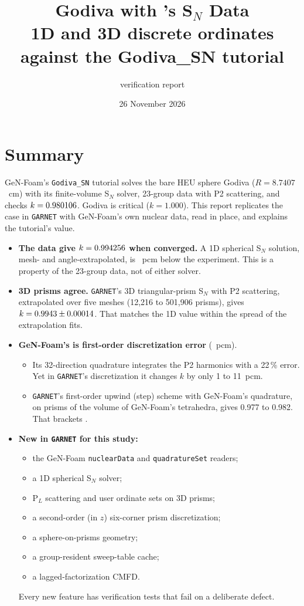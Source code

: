 \documentclass[a4paper,10pt]{article}
\title{\textbf{Godiva with \genfoam's S$_N$ Data}\\
\large \garnet{} 1D and 3D discrete ordinates against the \genfoam{} Godiva\_SN tutorial}
\author{\garnet{} verification report}
\date{26 November 2026}
\newcommand{\garnet}{\texttt{GARNET}}
\newcommand{\genfoam}{GeN-Foam}
\newcommand{\code}[1]{\texttt{#1}}
\begin{document}
\sloppy
\maketitle

\section*{Summary}

\genfoam's \code{Godiva\_SN} tutorial solves the bare HEU sphere Godiva
($R = 8.7407$~cm) with its finite-volume S$_N$ solver, 23-group data with P2
scattering, and checks $k = 0.980106$. Godiva is critical ($k = 1.000$). This
report replicates the case in \garnet{} with \genfoam's own nuclear data, read
in place, and explains the tutorial's value.

\begin{itemize}
\item \textbf{The data give $k = 0.994256$ when converged.} A 1D spherical S$_N$
  solution, mesh- and angle-extrapolated, is \DataGap~pcm below the experiment.
  This is a property of the 23-group data, not of either solver.
\item \textbf{3D prisms agree.} \garnet's 3D triangular-prism S$_N$ with P2
  scattering, extrapolated over five meshes (12,216 to 501,906 prisms),
  gives $k = 0.9943 \pm 0.00014$. That matches the 1D value
  within the spread of the extrapolation fits.
\item \textbf{\genfoam's \kGenFoam{} is first-order discretization error}
  (\GenFoamGap~pcm).
  \begin{itemize}
  \item Its 32-direction quadrature integrates the P2 harmonics with a
    22\,\% error. Yet in \garnet's discretization it changes $k$ by only 1 to
    11~pcm.
  \item \garnet's first-order upwind (step) scheme with \genfoam's
    quadrature, on prisms of the volume of \genfoam's tetrahedra, gives
    0.977 to 0.982. That brackets \kGenFoam.
  \end{itemize}
\item \textbf{New in \garnet{} for this study:}
  \begin{itemize}
  \item the \genfoam{} \code{nuclearData} and \code{quadratureSet} readers;
  \item a 1D spherical S$_N$ solver;
  \item P$_L$ scattering and user ordinate sets on 3D prisms;
  \item a second-order (in $z$) six-corner prism discretization;
  \item a sphere-on-prisms geometry;
  \item a group-resident sweep-table cache;
  \item a lagged-factorization CMFD.
  \end{itemize}
  Every new feature has verification tests that fail on a deliberate defect.
\end{itemize}
\end{document}
